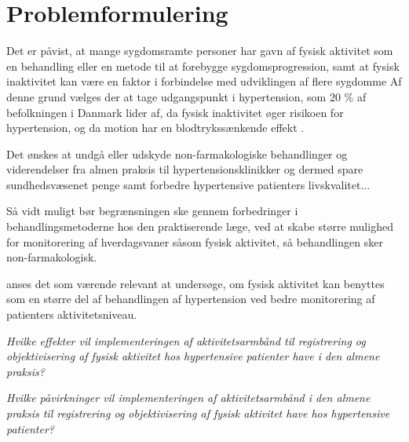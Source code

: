 \section{Problemformulering}


Det er påvist, at mange sygdomsramte personer har gavn af fysisk aktivitet som en behandling eller en metode til at forebygge sygdomsprogression, samt at fysisk inaktivitet kan være en faktor i forbindelse med udviklingen af flere sygdomme \citep{motionsraad2007,pedersen2011}
Af denne grund vælges der at tage udgangspunkt i hypertension, som 20 \% af befolkningen i Danmark lider af, da fysisk inaktivitet øger risikoen for hypertension, og da motion har en blodtrykssænkende effekt \citep{pedersen2011,olsen2015}. 

Det ønskes at undgå eller udskyde non-farmakologiske behandlinger og viderendelser fra almen praksis til hypertensionsklinikker og dermed spare sundhedsvæsenet penge samt forbedre hypertensive patienters livskvalitet...
 
Så vidt muligt bør begrænsningen ske gennem forbedringer i behandlingsmetoderne hos den praktiserende læge, ved at skabe større mulighed for monitorering af hverdagsvaner såsom fysisk aktivitet, så behandlingen sker non-farmakologisk.

anses det som værende relevant at undersøge, om fysisk aktivitet kan benyttes som en større del af behandlingen af hypertension ved bedre monitorering af patienters aktivitetsniveau. 


\textit{Hvilke effekter vil implementeringen af aktivitetsarmbånd til registrering og objektivisering af fysisk aktivitet hos hypertensive patienter have i den almene praksis?}

\textit{Hvilke påvirkninger vil implementeringen af aktivitetsarmbånd i den almene praksis til registrering og objektivisering af fysisk aktivitet have hos hypertensive patienter?}